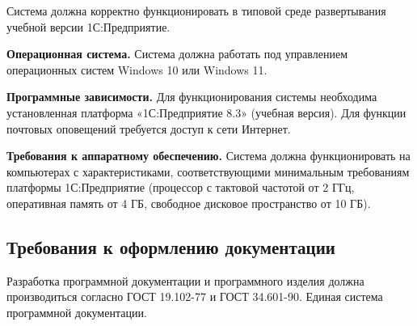 Система должна корректно функционировать в типовой среде развертывания учебной версии 1С:Предприятие.

\textbf{Операционная система.} Система должна работать под управлением операционных систем Windows 10 или Windows 11.

\textbf{Программные зависимости.} Для функционирования системы необходима установленная платформа «1С:Предприятие 8.3» (учебная версия). Для функции почтовых оповещений требуется доступ к сети Интернет.

\textbf{Требования к аппаратному обеспечению.} Система должна функционировать на компьютерах с характеристиками, соответствующими минимальным требованиям платформы 1С:Предприятие (процессор с тактовой частотой от 2 ГГц, оперативная память от 4 ГБ, свободное дисковое пространство от 10 ГБ).

\subsection{Требования к оформлению документации}

Разработка программной документации и программного изделия должна производиться согласно ГОСТ 19.102-77 и ГОСТ 34.601-90. Единая система программной документации.